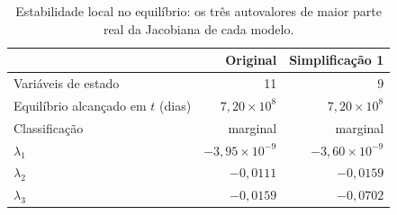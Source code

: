 \begin{table}[htbp]
\centering
\caption{Estabilidade local no equilíbrio: os três autovalores de maior parte real da Jacobiana de cada modelo.}
\label{tab:simp1-autovalores}
\begin{tabular}{lrr}
\toprule
 & Original & Simplificação 1 \\
\midrule
Variáveis de estado & 11 & 9 \\
Equilíbrio alcançado em $t$ (dias) & $7{,}20 \times 10^{8}$ & $7{,}20 \times 10^{8}$ \\
Classificação & marginal & marginal \\
$\lambda_{1}$ & $-3{,}95 \times 10^{-9}$ & $-3{,}60 \times 10^{-9}$ \\
$\lambda_{2}$ & $-0{,}0111$ & $-0{,}0159$ \\
$\lambda_{3}$ & $-0{,}0159$ & $-0{,}0702$ \\
\bottomrule
\end{tabular}
\end{table}
